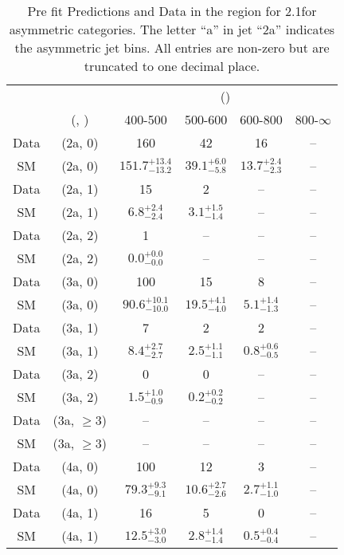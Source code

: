 \begin{table}[h!]
\tiny
\centering
\caption{Pre fit Predictions and Data in the \gj region for 2.1\ifb for asymmetric categories. The letter ``a'' in jet \eg ``2a''  indicates the asymmetric jet bins. All entries are non-zero but are truncated to one decimal place.\label{tab:predallnaive_gj_comb_asym}}
\begin{tabular}
{cccccc}
	\hline\hline
	&	& \multicolumn{4}{c}{\scalht (\gev)}\\ 
	&	 (\njet, \nb) & 400-500 & 500-600 & 600-800 & 800-$\infty$ \\ [0.8ex] 
\hline
	Data & (2a, 0) & 160 & 42 & 16 & -- \\[0.5ex] 
	SM & (2a, 0) & $151.7^{+ 13.4 }_{- 13.2 }$ & $39.1^{+ 6.0 }_{- 5.8 }$ & $13.7^{+ 2.4 }_{- 2.3 }$ & -- \\[0.5ex] 
	Data & (2a, 1) & 15 & 2 & -- & -- \\[0.5ex] 
	SM & (2a, 1) & $6.8^{+ 2.4 }_{- 2.4 }$ & $3.1^{+ 1.5 }_{- 1.4 }$ & -- & -- \\[0.5ex] 
	Data & (2a, 2) & 1 & -- & -- & -- \\[0.5ex] 
	SM & (2a, 2) & $0.0^{+ 0.0 }_{- 0.0 }$ & -- & -- & -- \\[0.5ex] 
	Data & (3a, 0) & 100 & 15 & 8 & -- \\[0.5ex] 
	SM & (3a, 0) & $90.6^{+ 10.1 }_{- 10.0 }$ & $19.5^{+ 4.1 }_{- 4.0 }$ & $5.1^{+ 1.4 }_{- 1.3 }$ & -- \\[0.5ex] 
	Data & (3a, 1) & 7 & 2 & 2 & -- \\[0.5ex] 
	SM & (3a, 1) & $8.4^{+ 2.7 }_{- 2.7 }$ & $2.5^{+ 1.1 }_{- 1.1 }$ & $0.8^{+ 0.6 }_{- 0.5 }$ & -- \\[0.5ex] 
	Data & (3a, 2) & 0 & 0 & -- & -- \\[0.5ex] 
	SM & (3a, 2) & $1.5^{+ 1.0 }_{- 0.9 }$ & $0.2^{+ 0.2 }_{- 0.2 }$ & -- & -- \\[0.5ex] 
	Data & (3a, $\ge3$) & -- & -- & -- & -- \\[0.5ex] 
	SM & (3a, $\ge3$) & -- & -- & -- & -- \\[0.5ex] 
	Data & (4a, 0) & 100 & 12 & 3 & -- \\[0.5ex] 
	SM & (4a, 0) & $79.3^{+ 9.3 }_{- 9.1 }$ & $10.6^{+ 2.7 }_{- 2.6 }$ & $2.7^{+ 1.1 }_{- 1.0 }$ & -- \\[0.5ex] 
	Data & (4a, 1) & 16 & 5 & 0 & -- \\[0.5ex] 
	SM & (4a, 1) & $12.5^{+ 3.0 }_{- 3.0 }$ & $2.8^{+ 1.4 }_{- 1.4 }$ & $0.5^{+ 0.4 }_{- 0.4 }$ & -- \\[0.5ex] 

\end{tabular}
\end{table}
